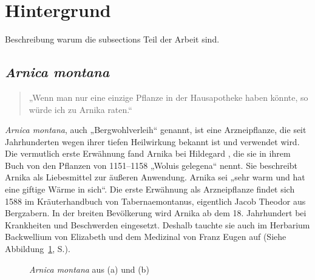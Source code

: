 \section{Hintergrund}\label{kapitel1}

Beschreibung warum die subsections Teil der Arbeit sind. 

\subsection{\textit{Arnica montana}}

\begin{quotation}
„Wenn man nur eine einzige Pflanze in der Hausapotheke haben könnte, so würde ich zu Arnika raten.“ \citep[S. 186]{Sommer2011}
\end{quotation}

\textit{Arnica montana}, auch „Bergwohlverleih“ genannt, ist eine Arzneipflanze, die seit Jahrhunderten wegen ihrer tiefen Heilwirkung bekannt ist und verwendet wird. Die vermutlich erste Erwähnung fand Arnika bei Hildegard \citet{Bingen2007}, die sie in ihrem Buch von den Pflanzen von 1151–1158 „Woluis gelegena“ nennt. Sie beschreibt Arnika als Liebesmittel zur äußeren Anwendung. Arnika sei „sehr warm und hat eine giftige Wärme in sich“. Die erste Erwähnung als Arzneipflanze findet sich 1588 im Kräuterhandbuch von Tabernaemontanus, eigentlich Jacob Theodor aus Bergzabern. In der breiten Bevölkerung wird Arnika ab dem 18. Jahrhundert bei Krankheiten und Beschwerden eingesetzt. Deshalb tauchte sie auch im Herbarium Backwellium von Elizabeth \citet{Blackwell1757} und dem Medizinal von Franz Eugen \citet{Kohler1887} auf (Siehe Abbildung~\ref{fig:Zeichnung}, S.\pageref{fig:Zeichnung}).

\begin{figure}[htb]
\caption{\textit{Arnica montana} aus \citet{Blackwell1757} (a) und \citet{Kohler1887} (b)}
  \label{fig:Zeichnung}
\end{figure}

